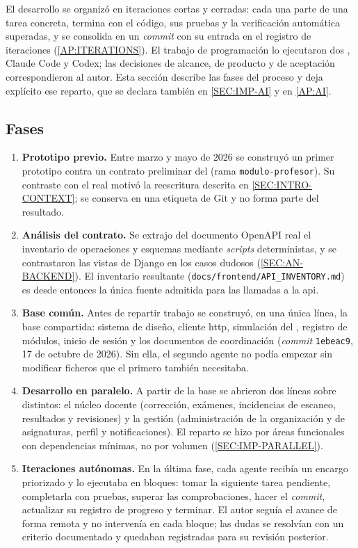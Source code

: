 El desarrollo se organizó en iteraciones cortas y cerradas: cada una parte de una tarea
concreta, termina con el código, sus pruebas y la verificación automática superadas, y se
consolida en un \textit{commit} con su entrada en el registro de iteraciones
(\cref{AP:ITERATIONS}). El trabajo de programación lo ejecutaron dos , Claude
Code y Codex; las decisiones de alcance, de producto y de aceptación correspondieron al autor.
Esta sección describe las fases del proceso y deja explícito ese reparto, que se declara
también en \cref{SEC:IMP-AI} y en \cref{AP:AI}.

\subsection{Fases}

\begin{enumerate}
  \item \textbf{Prototipo previo.} Entre marzo y mayo de 2026 se construyó un primer
        prototipo contra un contrato preliminar del  (rama
        \texttt{modulo-profesor}). Su contraste con el  real motivó la
        reescritura descrita en \cref{SEC:INTRO-CONTEXT}; se conserva en una etiqueta de
        Git y no forma parte del resultado.
  \item \textbf{Análisis del contrato.} Se extrajo del documento OpenAPI real el
        inventario de operaciones y esquemas mediante \textit{scripts} deterministas, y
        se contrastaron las vistas de Django en los casos dudosos (\cref{SEC:AN-BACKEND}).
        El inventario resultante (\texttt{docs/frontend/API\_INVENTORY.md}) es desde
        entonces la única fuente admitida para las llamadas a la \acs{api}.
  \item \textbf{Base común.} Antes de repartir trabajo se construyó, en una única línea, la
        base compartida: sistema de diseño, cliente \acs{http}, simulación del
        , registro de módulos, inicio de sesión y los documentos de
        coordinación (\textit{commit} \texttt{1ebeac9}, 17 de octubre de 2026). Sin ella,
        el segundo agente no podía empezar sin modificar ficheros que el primero también
        necesitaba.
  \item \textbf{Desarrollo en paralelo.} A partir de la base se abrieron dos líneas sobre
         distintos: el núcleo docente (corrección, exámenes, incidencias de
        escaneo, resultados y revisiones) y la gestión (administración de la organización y
        de asignaturas, perfil y notificaciones). El reparto se hizo por áreas funcionales
        con dependencias mínimas, no por volumen (\cref{SEC:IMP-PARALLEL}).
  \item \textbf{Iteraciones autónomas.} En la última fase, cada agente recibía un encargo
        priorizado y lo ejecutaba en bloques: tomar la siguiente tarea pendiente,
        completarla con pruebas, superar las comprobaciones, hacer el \textit{commit},
        actualizar su registro de progreso y terminar. El autor seguía el avance de forma
        remota y no intervenía en cada bloque; las dudas se resolvían con un criterio
        documentado y quedaban registradas para su revisión posterior.
\end{enumerate}

